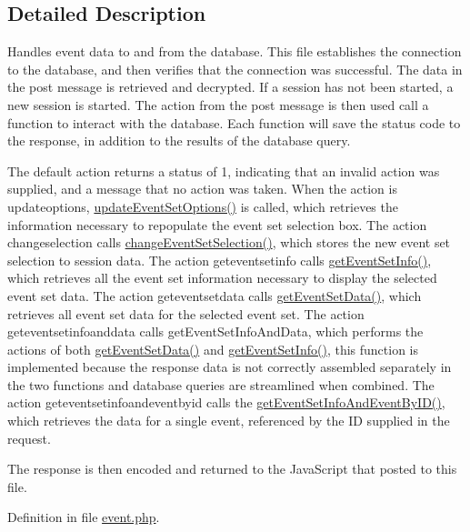 \subsection{\-Detailed \-Description}
\-Handles event data to and from the database. \-This file establishes the connection to the database, and then verifies that the connection was successful. \-The data in the post message is retrieved and decrypted. \-If a session has not been started, a new session is started. \-The action from the post message is then used call a function to interact with the database. \-Each function will save the status code to the response, in addition to the results of the database query.

\-The default action returns a status of 1, indicating that an invalid action was supplied, and a message that no action was taken. \-When the action is updateoptions, \hyperlink{event_8php_a93eabb06ba8025e80af7dde1341c758d}{update\-Event\-Set\-Options()} is called, which retrieves the information necessary to repopulate the event set selection box. \-The action changeselection calls \hyperlink{event_8php_a13aad0d75556ac9ae9f50ee754bd36f5}{change\-Event\-Set\-Selection()}, which stores the new event set selection to session data. \-The action geteventsetinfo calls \hyperlink{event_8php_ac111287cb3782ef6b2b3a5c5333a0164}{get\-Event\-Set\-Info()}, which retrieves all the event set information necessary to display the selected event set data. \-The action geteventsetdata calls \hyperlink{event_8php_a7e9028ad62a69bbcf78178653228b348}{get\-Event\-Set\-Data()}, which retrieves all event set data for the selected event set. \-The action geteventsetinfoanddata calls get\-Event\-Set\-Info\-And\-Data, which performs the actions of both \hyperlink{event_8php_a7e9028ad62a69bbcf78178653228b348}{get\-Event\-Set\-Data()} and \hyperlink{event_8php_ac111287cb3782ef6b2b3a5c5333a0164}{get\-Event\-Set\-Info()}, this function is implemented because the response data is not correctly assembled separately in the two functions and database queries are streamlined when combined. \-The action geteventsetinfoandeventbyid calls the \hyperlink{event_8php_a64e52607180419f5ac4ce6969f9a3725}{get\-Event\-Set\-Info\-And\-Event\-By\-I\-D()}, which retrieves the data for a single event, referenced by the \-I\-D supplied in the request.

\-The response is then encoded and returned to the \-Java\-Script that posted to this file. 

\-Definition in file \hyperlink{event_8php_source}{event.\-php}.



